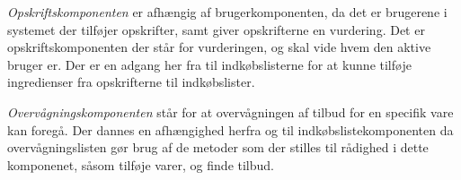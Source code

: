 \textit{Opskriftskomponenten} er afhængig af brugerkomponenten, da det er brugerene i systemet der tilføjer opskrifter, samt giver opskrifterne en vurdering.
Det er opskriftskomponenten der står for vurderingen, og skal vide hvem den aktive bruger er.
Der er en adgang her fra til indkøbslisterne for at kunne tilføje ingredienser fra opskrifterne til indkøbslister.

\textit{Overvågningskomponenten} står for at overvågningen af tilbud for en specifik vare kan foregå.
Der dannes en afhængighed herfra og til indkøbslistekomponenten da overvågningslisten gør brug af de metoder som der stilles til rådighed i dette komponenet, såsom tilføje varer, og finde tilbud.



